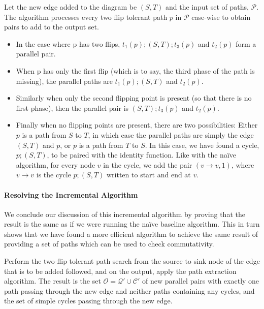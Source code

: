 \documentclass[sigplan]{acmart}
\begin{document}
Let the new edge added to the diagram be $(S, T)$ and the input set of paths, $\mathcal{P}$.
The algorithm processes every two flip tolerant path $p$ in $\mathcal{P}$ case-wise to obtain pairs to add to the output set.
\begin{itemize}
\item In the case where p has two flips, $t_1(p) ; (S, T) ; t_3(p)$ and $t_2(p)$ form a parallel pair.
\item When p has only the first flip (which is to say, the third phase of the path is missing), the parallel paths are $t_1(p) ; (S, T)$ and $t_2(p)$.
\item Similarly when only the second flipping point is present (so that there is no first phase), then the parallel pair is  $(S, T) ; t_3(p)$ and $t_2(p)$.
\item Finally when no flipping points are present, there are two possibilities:
Either $p$ is a path from $S$ to $T$, in which case the parallel paths are simply the edge $(S, T)$ and $p$, or $p$ is a path from $T$ to $S$.
In this case, we have found a cycle, $p ; (S,T)$, to be paired with the identity function.
Like with the na\"{i}ve algorithm, for every node $v$ in the cycle, we add the pair $(v \rightarrow v, 1)$, where $v \rightarrow v$ is the cycle $p ; (S,T)$ written to start and end at $v$.
\end{itemize}

\paragraph{Resolving the Incremental Algorithm}
We conclude our discussion of this incremental algorithm by proving that the result is the same as if we were running the na\"{i}ve baseline algorithm.  This in turn shows that we have found a more efficient algorithm to achieve the same result of providing a set of paths which can be used to check commutativity.

\begin{theorem}
    Perform the two-flip tolerant path search from the source to sink node of the edge that is to be added followed, and on the output, apply the path extraction algorithm. 
    The result is the set $\mathcal{O} = \mathcal{Q}'\cup \mathcal{C}'$ of new parallel pairs with exactly one path passing through the new edge and neither paths containing any cycles, and the set of simple cycles passing through the new edge.
\end{theorem}
\end{document}
